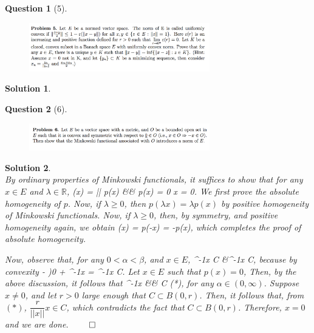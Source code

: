 \documentclass{article} %
\def\eQb#1\eQe{\begin{eqnarray*}#1\end{eqnarray*}}
\theoremstyle{quest}
\newtheorem*{question}{Question}
\newtheorem*{solution}{Solution}
\begin{document}
\newpage

\begin{question}[5]
\hfill
\begin{figure}[h!]
  \centering
    \includegraphics[width=0.7\textwidth]{funcA-h-e1-p5.png}
\end{figure}
\end{question}
\begin{solution} \hfill \\
\end{solution}

\newpage

\begin{question}[6]
\hfill
\begin{figure}[h!]
  \centering
    \includegraphics[width=0.7\textwidth]{funcA-h-e1-p6.png}
\end{figure}
\end{question}
\begin{solution} \hfill \\
By ordinary properties of Minkowski functionals, it suffices to show that
for any $x \in E$ and $\lambda \in \mathbb{R}$,
\eQb
p(\lambda x) = |\lambda| p(x) \>\> && \>\>
p(x) = 0 \implies x = 0.
\eQe
We first prove the absolute homogeneity of $p$.
Now, if $\lambda \geq 0$,
then $p(\lambda x) = \lambda p(x)$ by positive homogeneity of Minkowski functionals.
Now, if $\lambda \geq 0$, then, by symmetry, and positive homogeneity again,
we obtain
\eQb
p(\lambda x) = p(-\lambda x) = -\lambda p(x), 
\eQe
which completes the proof of absolute homogeneity. 

\bigskip

Now, observe that, for any $0 <\alpha < \beta$, and $x \in E$, 
\eQb
\alpha^{-1}x \in C &\implies \beta^{-1}x \in C,
\eQe
because by convexity
\eQb
(1- )0 + \alpha^{-1}x
= \beta^{-1}x \in C.
\eQe
Let $x \in E$ such that $p(x) = 0$, Then, by the above discussion,
it follows that
\eQb
\alpha^{-1}x &\in& C \>\>\> (*),
\eQe
for any $\alpha \in (0,\infty)$. Suppose $x \neq 0$, and let $r > 0$ 
large enough that $C \subset B(0,r)$. Then, it follows that, from $(*)$,
$\dfrac{r}{||x||}x \in C$, which contradicts the fact that $C \subset B(0,r)$.
Therefore, $x = 0$ and we are done. \hfill $\qed$
\end{solution}
\end{document}
